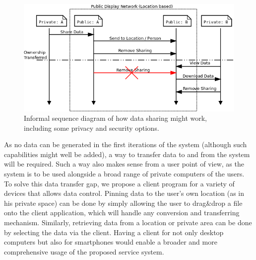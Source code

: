 \begin{figure}
	\centering
	\includegraphics[width=\linewidth]{img/data_sharing.png}
	\caption[Data Sharing Sequence]{Informal sequence diagram of how data sharing might work, including some privacy and security options.}
	\label{data_share_sequence}
\end{figure}

As no data can be generated in the first iterations of the system (although such capabilities might well be added), a way to transfer data to and from the system will be required.
Such a way also makes sense from a user point of view, as the system is to be used alongside a broad range of private computers of the users.
To solve this data transfer gap, we propose a client program for a variety of devices that allows data control.
Pinning data to the user's own location (as in his private space) can be done by simply allowing the user to drag\&drop a file onto the client application, which will handle any conversion and transferring mechanism.
Similarly, retrieving data from a location or private area can be done by selecting the data via the client.
Having a client for not only desktop computers but also for smartphones would enable a broader and more comprehensive usage of the proposed service system.
